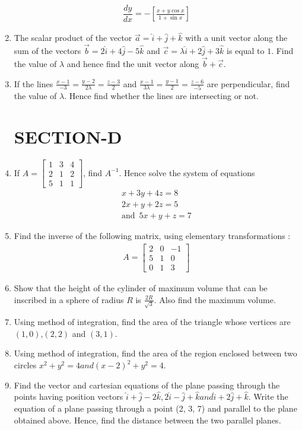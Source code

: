 \documentclass[12pt,letterpaper]{article}
\newcommand{\brak}[1]{\left( #1 \right)}
\newcommand{\mybit}[9]{\begin{bmatrix} #1 & #2 & #3 \\ #4 & #5 & #6 \\ #7 & #8 & #9 \end{bmatrix}}
\newcommand{\sbrak}[1]{\left[#1\right]}
\begin{document}
\begin{enumerate}
\begin{align*}
\dfrac{dy}{dx}= -\sbrak{\frac{x+y\cos x}{1+\sin x}}
\end{align*}
\item The scalar product of the vector $\overrightarrow{a} = \hat{i}+\hat{j}+\hat{k}$ with a unit vector along the sum of the vectors $\overrightarrow{b} = 2\hat{i}+4\hat{j}-5\hat{k}$ and $\overrightarrow{c} = \lambda\hat{i}+2\hat{j}+3\hat{k}$ is equal to $1$. Find the value of $\lambda$ and hence find the unit vector along $\overrightarrow{b}+\overrightarrow{c}$.
\item If the lines $\frac{x-1}{-3}=\frac{y-2}{2\lambda}=\frac{z-3}{2}$ and $\frac{x-1}{3\lambda}=\frac{y-1}{2}=\frac{z-6}{-5}$ are perpendicular, find the value of $\lambda$. Hence find whether the lines are intersecting or not.
\section*{SECTION-D}
\item If ${A} = \mybit{1}{3}{4}{2}{1}{2}{5}{1}{1}$, find $A^{-1}$.
        Hence solve the system of equations 
            \begin{align*}
                {x+3y+4z}=8 \\
                {2x+y+2z}=5 \\
            \text{and}\hspace{6pt} {5x+y+z} =7
            \end{align*}
\item Find the inverse of the following matrix, using elementary transformations :
                \begin{align*}
                {{A}} = \mybit{2}{0}{-1}{5}{1}{0}{0}{1}{3}
                \end{align*}
\item Show that the height of the cylinder of maximum volume that can be inscribed in a sphere of radius $R$ is $\frac{2R}{\sqrt{3}}$. Also find the maximum volume.
\item Using method of integration, find the area of the triangle whose vertices are $\brak{1,0}$,$\brak{2,2}$ and $\brak{3,1}$.
\item Using method of integration, find the area of the region enclosed between two circles ${x^2+y^2=4} and \brak{x-2}^2+{y^2}=4$.

\item Find the vector and cartesian equations of the plane passing through the points having position vectors $\hat{i}+\hat{j}-2\hat{k}, 2\hat{i}-\hat{j}+\hat{k} and \hat{i}+2\hat{j}+\hat{k}$. Write the equation of a plane passing through a point (2, 3, 7) and parallel to the plane obtained above. Hence, find the distance between the two parallel planes.    
 


\end{enumerate}
\end{document}
